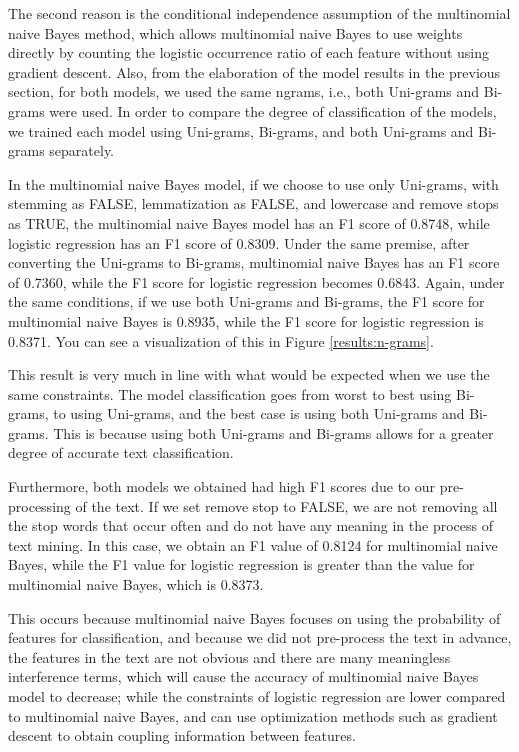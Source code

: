 \documentclass[a4paper, 11pt]{article}
\begin{document}
\begin{multicols}{2}
The second reason is the conditional independence assumption of the multinomial naive Bayes method, which allows multinomial naive Bayes to use weights directly by counting the logistic occurrence ratio of each feature without using gradient descent. Also, from the elaboration of the model results in the previous section, for both models, we used the same ngrams, i.e., both Uni-grams and Bi-grams were used. In order to compare the degree of classification of the models, we trained each model using Uni-grams, Bi-grams, and both Uni-grams and Bi-grams separately. 

In the multinomial naive Bayes model, if we choose to use only Uni-grams, with stemming as FALSE, lemmatization as FALSE, and lowercase and remove stops as TRUE, the multinomial naive Bayes model has an F1 score of 0.8748, while logistic regression has an F1 score of 0.8309. Under the same premise, after converting the Uni-grams to Bi-grams, multinomial naive Bayes has an F1 score of 0.7360, while the F1 score for logistic regression becomes 0.6843. Again, under the same conditions, if we use both Uni-grams and Bi-grams, the F1 score for multinomial naive Bayes is 0.8935, while the F1 score for logistic regression is 0.8371. You can see a visualization of this in Figure \ref{results:n-grams}.

This result is very much in line with what would be expected when we use the same constraints. The model classification goes from worst to best using Bi-grams, to using Uni-grams, and the best case is using both Uni-grams and Bi-grams. This is because using both Uni-grams and Bi-grams allows for a greater degree of accurate text classification.

Furthermore, both models we obtained had high F1 scores due to our pre-processing of the text. If we set remove stop to FALSE, we are not removing all the stop words that occur often and do not have any meaning in the process of text mining. In this case, we obtain an F1 value of 0.8124 for multinomial naive Bayes, while the F1 value for logistic regression is greater than the value for multinomial naive Bayes, which is 0.8373. 

This occurs because multinomial naive Bayes focuses on using the probability of features for classification, and because we did not pre-process the text in advance, the features in the text are not obvious and there are many meaningless interference terms, which will cause the accuracy of multinomial naive Bayes model to decrease; while the constraints of logistic regression are lower compared to multinomial naive Bayes, and can use optimization methods such as gradient descent to obtain coupling information between features.


\end{multicols}
\end{document}
